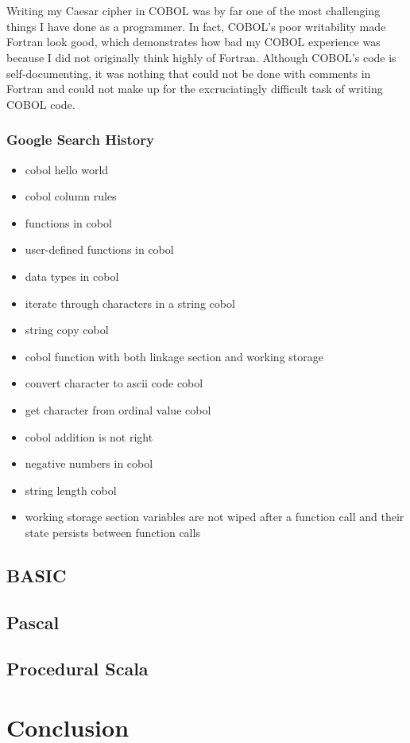 \documentclass[letterpaper, 10pt, DIV=13]{scrartcl}
\numberwithin{equation}{section}
\numberwithin{figure}{section}
\numberwithin{table}{section}
\begin{document}
\\ \\
Writing my Caesar cipher in COBOL was by far one of the most challenging things I have done as a programmer. In fact, COBOL's poor writability made Fortran look good, which demonstrates how bad my COBOL experience was because I did not originally think highly of Fortran. Although COBOL's code is self-documenting, it was nothing that could not be done with comments in Fortran and could not make up for the excruciatingly difficult task of writing COBOL code.

\subsubsection{Google Search History}
\begin{itemize}
	\item cobol hello world
	\item cobol column rules
	\item functions in cobol
	\item user-defined functions in cobol
	\item data types in cobol
	\item iterate through characters in a string cobol
	\item string copy cobol
	\item cobol function with both linkage section and working storage
	\item convert character to ascii code cobol
	\item get character from ordinal value cobol
	\item cobol addition is not right
	\item negative numbers in cobol
	\item string length cobol
	\item working storage section variables are not wiped after a function call and their state persists between function calls
\end{itemize}

\subsection{BASIC}

\subsection{Pascal}

\subsection{Procedural Scala}

\section{Conclusion}
\end{document}
